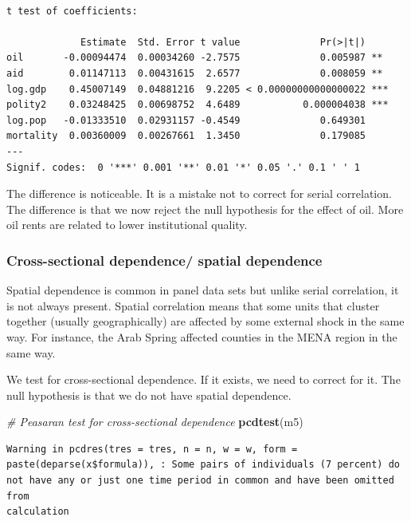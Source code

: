 \documentclass[]{article}
\newenvironment{Shaded}{\begin{snugshade}}{\end{snugshade}}
\newcommand{\KeywordTok}[1]{\textcolor[rgb]{0.13,0.29,0.53}{\textbf{#1}}}
\newcommand{\CommentTok}[1]{\textcolor[rgb]{0.56,0.35,0.01}{\textit{#1}}}
\newcommand{\NormalTok}[1]{#1}
\theoremstyle{definition}
\theoremstyle{definition}
\theoremstyle{definition}
\theoremstyle{remark}
\begin{document}
\begin{verbatim}

t test of coefficients:

             Estimate  Std. Error t value              Pr(>|t|)    
oil       -0.00094474  0.00034260 -2.7575              0.005987 ** 
aid        0.01147113  0.00431615  2.6577              0.008059 ** 
log.gdp    0.45007149  0.04881216  9.2205 < 0.00000000000000022 ***
polity2    0.03248425  0.00698752  4.6489           0.000004038 ***
log.pop   -0.01333510  0.02931157 -0.4549              0.649301    
mortality  0.00360009  0.00267661  1.3450              0.179085    
---
Signif. codes:  0 '***' 0.001 '**' 0.01 '*' 0.05 '.' 0.1 ' ' 1
\end{verbatim}

The difference is noticeable. It is a mistake not to correct for serial
correlation. The difference is that we now reject the null hypothesis
for the effect of oil. More oil rents are related to lower institutional
quality.

\subsubsection{Cross-sectional dependence/ spatial
dependence}\label{cross-sectional-dependence-spatial-dependence}

Spatial dependence is common in panel data sets but unlike serial
correlation, it is not always present. Spatial correlation means that
some units that cluster together (usually geographically) are affected
by some external shock in the same way. For instance, the Arab Spring
affected counties in the MENA region in the same way.

We test for cross-sectional dependence. If it exists, we need to correct
for it. The null hypothesis is that we do not have spatial dependence.

\begin{Shaded}
\begin{Highlighting}[]
\CommentTok{# Peasaran test for cross-sectional dependence}
\KeywordTok{pcdtest}\NormalTok{(m5)}
\end{Highlighting}
\end{Shaded}

\begin{verbatim}
Warning in pcdres(tres = tres, n = n, w = w, form =
paste(deparse(x$formula)), : Some pairs of individuals (7 percent) do
not have any or just one time period in common and have been omitted from
calculation
\end{verbatim}
\end{document}
